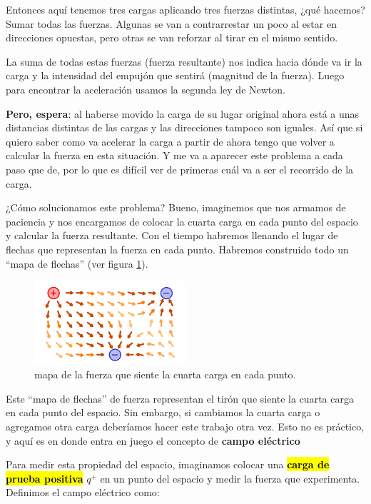 Entonces aquí tenemos tres cargas aplicando tres fuerzas distintas, ¿qué hacemos? Sumar todas las fuerzas. Algunas se van a contrarrestar un poco al estar en direcciones opuestas, pero otras se van reforzar al tirar en el mismo sentido.

La suma de todas estas fuerzas (fuerza resultante) nos indica hacia dónde va ir la carga y la intensidad del empujón que sentirá (magnitud de la fuerza). Luego para encontrar la aceleración usamos la segunda ley de Newton. 

\textbf{Pero, espera}: al haberse movido la carga de su lugar original ahora está a unas distancias distintas de las cargas y las direcciones tampoco son iguales. Así que si quiero saber como va acelerar la carga a partir de ahora tengo que volver a calcular la fuerza en esta situación. Y me va a aparecer este problema a cada paso que de, por lo que es difícil ver de primeras cuál va a ser el recorrido de la carga.

¿Cómo solucionamos este problema? Bueno, imaginemos que nos armamos de paciencia y nos encargamos de colocar la cuarta carga en cada punto del espacio y calcular la fuerza resultante. Con el tiempo habremos llenando el lugar de flechas que representan la fuerza en cada punto. Habremos construido todo un ``mapa de flechas'' (ver figura \ref{fig:campo_electrico_ejemplo_3}).

\begin{figure}[ht]
    \centering
    \includegraphics[width=0.5\textwidth]{images/field_example.png}
    \caption{mapa de la fuerza que siente la cuarta carga en cada punto.}
    \label{fig:campo_electrico_ejemplo_3}
\end{figure}

Este ``mapa de flechas'' de fuerza representan el tirón que siente la cuarta carga en cada punto del espacio. Sin embargo, si cambiamos la cuarta carga o agregamos otra carga deberíamos hacer este trabajo otra vez. Esto no es práctico, y aquí es en donde entra en juego el concepto de \textbf{campo eléctrico}


Para medir esta propiedad del espacio, imaginamos colocar una \hl{\textbf{carga de prueba positiva}} \( q^{+} \) en un punto del espacio y medir la fuerza que experimenta. Definimos el campo eléctrico como:

